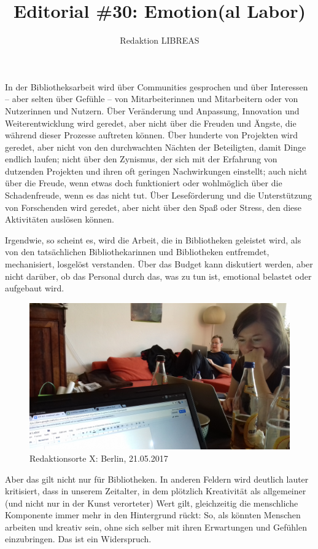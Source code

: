 \documentclass[a4paper,
fontsize=11pt,
oneside,
numbers=noperiodatend,
parskip=half-,
bibliography=totoc,
final
]{scrartcl}
\title{\LARGE{Editorial \#30: Emotion(al Labor)}} %
\author{Redaktion LIBREAS} %
\date{}
\begin{document}
\maketitle
\thispagestyle{fancyplain} 


In der Bibliotheksarbeit wird über Communities gesprochen und über
Interessen -- aber selten über Gefühle -- von Mitarbeiterinnen und
Mitarbeitern oder von Nutzerinnen und Nutzern. Über Veränderung und
Anpassung, Innovation und Weiterentwicklung wird geredet, aber nicht
über die Freuden und Ängste, die während dieser Prozesse auftreten
können. Über hunderte von Projekten wird geredet, aber nicht von den
durchwachten Nächten der Beteiligten, damit Dinge endlich laufen; nicht
über den Zynismus, der sich mit der Erfahrung von dutzenden Projekten
und ihren oft geringen Nachwirkungen einstellt; auch nicht über die
Freude, wenn etwas doch funktioniert oder wohlmöglich über die
Schadenfreude, wenn es das nicht tut. Über Leseförderung und die
Unterstützung von Forschenden wird geredet, aber nicht über den Spaß
oder Stress, den diese Aktivitäten auslösen können.

Irgendwie, so scheint es, wird die Arbeit, die in Bibliotheken geleistet
wird, als von den tatsächlichen Bibliothekarinnen und Bibliotheken
entfremdet, mechanisiert, losgelöst verstanden. Über das Budget kann
diskutiert werden, aber nicht darüber, ob das Personal durch das, was zu
tun ist, emotional belastet oder aufgebaut wird.

\begin{figure}
\centering
\includegraphics{Editorial-1.jpg}
\caption{Redaktionsorte X: Berlin, 21.05.2017}
\end{figure}

Aber das gilt nicht nur für Bibliotheken. In anderen Feldern wird
deutlich lauter kritisiert, dass in unserem Zeitalter, in dem plötzlich
Kreativität als allgemeiner (und nicht nur in der Kunst verorteter) Wert
gilt, gleichzeitig die menschliche Komponente immer mehr in den
Hintergrund rückt: So, als könnten Menschen arbeiten und kreativ sein,
ohne sich selber mit ihren Erwartungen und Gefühlen einzubringen. Das
ist ein Widerspruch.
\end{document}
